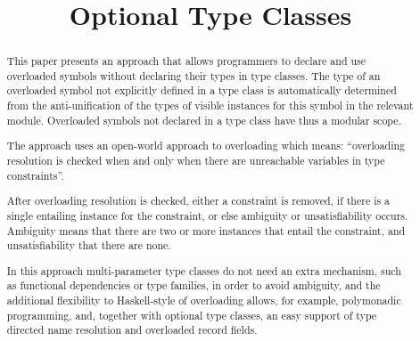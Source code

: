 \documentclass[review]{elsarticle}
\begin{document}
\begin{frontmatter}

\title{Optional Type Classes}

\begin{abstract}

This paper presents an approach that allows programmers to declare and
use overloaded symbols without declaring their types in type
classes. The type of an overloaded symbol not explicitly defined in a
type class is automatically determined from the anti-unification of
the types of visible instances for this symbol in the relevant module.
Overloaded symbols not declared in a type class have thus a modular
scope.


The approach uses an open-world approach to overloading which means:
``overloading resolution is checked when and only when there are
unreachable variables in type constraints''.

After overloading resolution is checked, either a constraint is
removed, if there is a single entailing instance for the constraint,
or else ambiguity or unsatisfiability occurs. Ambiguity means that
there are two or more instances that entail the constraint, and
unsatisfiability that there are none.


In this approach multi-parameter type classes do not need an extra
mechanism, such as functional dependencies or type families, in order
to avoid ambiguity, and the additional flexibility to Haskell-style of
overloading allows, for example, polymonadic programming, and,
together with optional type classes, an easy support of type directed
name resolution and overloaded record fields.




\end{abstract}
\end{frontmatter}
\end{document}
